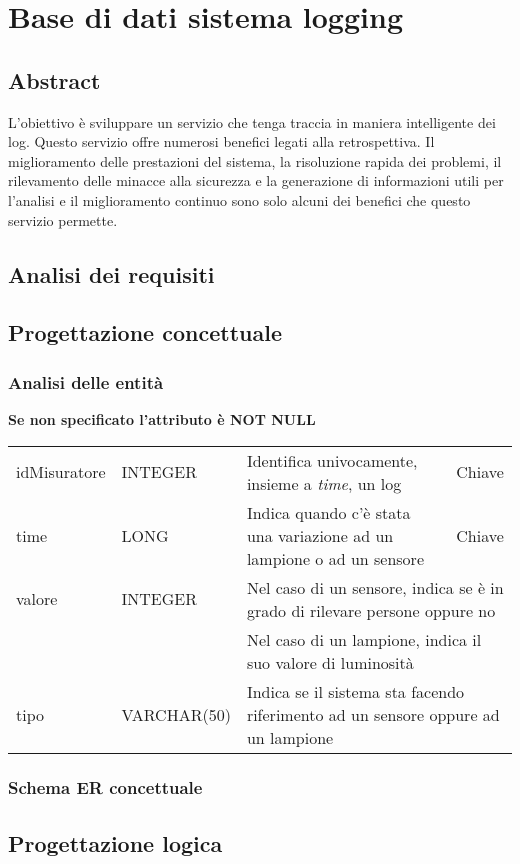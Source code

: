 \section{Base di dati sistema logging}

\subsection{Abstract}

L’obiettivo è sviluppare un servizio che tenga traccia in maniera intelligente dei log. Questo servizio offre numerosi benefici legati alla retrospettiva. Il miglioramento delle prestazioni del sistema, la risoluzione rapida dei problemi, il rilevamento delle minacce alla sicurezza e la generazione di informazioni utili per l'analisi e il miglioramento continuo sono solo alcuni dei benefici che questo servizio permette.

\subsection{Analisi dei requisiti}

\subsection{Progettazione concettuale}

\subsubsection{Analisi delle entità}

\textbf{Se non specificato l'attributo è NOT NULL}

\begin{center}
    \begin{tabularx}{\textwidth}{|l|l|l|X|}
        \hline
        \rowcolor{gray!30}
        \multicolumn{4}{|c|}{\textbf{LOG}}\\
        \hline
        idMisuratore & INTEGER & Identifica univocamente, insieme a {\it{time}}, un log & Chiave\\
        \hline
        time & LONG & Indica quando c'è stata una variazione ad un lampione o ad un sensore & Chiave\\
        \hline
        valore & INTEGER & \multicolumn{2}{l|}{Nel caso di un sensore, indica se è in grado di rilevare persone oppure no} \\
        & & \multicolumn{2}{l|}{Nel caso di un lampione, indica il suo valore di luminosità} \\
        \hline
        tipo & VARCHAR(50) & \multicolumn{2}{l|}{Indica se il sistema sta facendo riferimento ad un sensore oppure ad un lampione} \\
        \hline
    \end{tabularx}
\end{center}

\subsubsection{Schema ER concettuale}

\subsection{Progettazione logica}